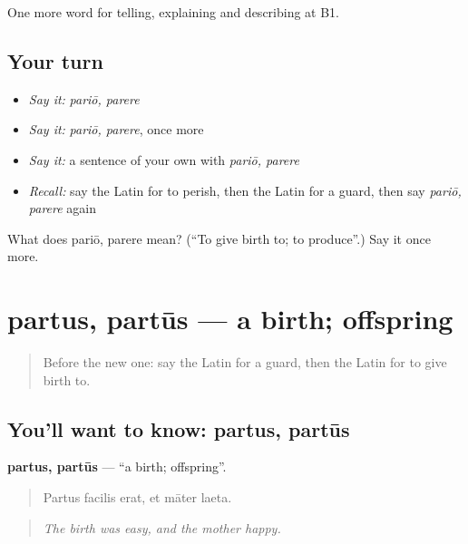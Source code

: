 \begin{grammarlens}[title={What you've built}]
One more word for telling, explaining and describing at B1.
\end{grammarlens}

\subsection*{Your turn}
\begin{itemize}
\raggedright
  \item \emph{Say it:} \emph{pariō, parere}
  \item \emph{Say it:} \emph{pariō, parere}, once more
  \item \emph{Say it:} a sentence of your own with \emph{pariō, parere}
  \item \emph{Recall:} say the Latin for to perish, then the Latin for a guard, then say \emph{pariō, parere} again
\end{itemize}

\begin{tcolorbox}[breakable,colback=teal!4,colframe=teal!35!black,title={Before you move on}]
What does pariō, parere mean? (\textquotedblleft{}To give birth to; to produce\textquotedblright{}.) Say it once more.
\end{tcolorbox}
\section[partus, partūs]{partus, partūs — a birth; offspring}

\label{lesson:LA-C323-partus}



\begin{quote}
Before the new one: say the Latin for a guard, then the Latin for to give birth to.
\end{quote}

\subsection*{You'll want to know: partus, partūs}
\textbf{partus, partūs} — \textquotedblleft{}a birth; offspring\textquotedblright{}.

\begin{quote}
Partus facilis erat, et māter laeta.
\end{quote}

\begin{quote}
\emph{The birth was easy, and the mother happy.}
\end{quote}

